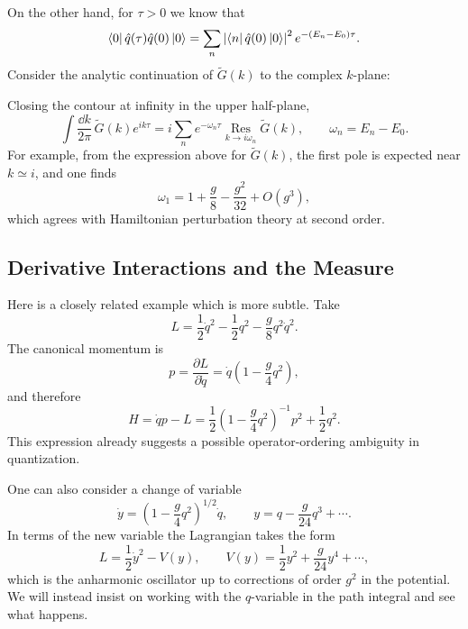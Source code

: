 On the other hand, for \(\tau>0\) we know that
\[
  \bra{0}\hat q(\tau)\hat q(0)\ket{0}
  =
  \sum_n
  \left|\bra{n}\hat q(0)\ket{0}\right|^2
  e^{-(E_n-E_0)\tau}.
\]
Consider the analytic continuation of \(\widetilde G(k)\) to the complex
\(k\)-plane:
\begin{center}
\end{center}
Closing the contour at infinity in the upper half-plane,
\[
  \int\frac{\dd k}{2\pi}\,\widetilde G(k)e^{ik\tau}
  =
  i\sum_n e^{-\omega_n\tau}
  \operatorname*{Res}_{k\to i\omega_n}\widetilde G(k),
  \qquad
  \omega_n=E_n-E_0.
\]
For example, from the expression above for \(\widetilde G(k)\), the first
pole is expected near \(k\simeq i\), and one finds
\[
  \omega_1
  =
  1+\frac{g}{8}-\frac{g^2}{32}+O(g^3),
\]
which agrees with Hamiltonian perturbation theory at second order.

\subsection{Derivative Interactions and the Measure}

Here is a closely related example which is more subtle. Take
\[
  L=\frac12\dot q^2-\frac12 q^2-\frac{g}{8}q^2\dot q^2 .
\]
The canonical momentum is
\[
  p=\frac{\partial L}{\partial \dot q}
    =\dot q\left(1-\frac{g}{4}q^2\right),
\]
and therefore
\[
  H=\dot q p-L
   =\frac12\left(1-\frac{g}{4}q^2\right)^{-1}p^2+\frac12q^2 .
\]
This expression already suggests a possible operator-ordering ambiguity in
quantization.

One can also consider a change of variable
\[
  \dot y=\left(1-\frac{g}{4}q^2\right)^{1/2}\dot q,
  \qquad
  y=q-\frac{g}{24}q^3+\cdots .
\]
In terms of the new variable the Lagrangian takes the form
\[
  L=\frac12\dot y^2-V(y),
  \qquad
  V(y)=\frac12 y^2+\frac{g}{24}y^4+\cdots ,
\]
which is the anharmonic oscillator up to corrections of order \(g^2\) in the
potential. We will instead insist on working with the \(q\)-variable in the
path integral and see what happens.

